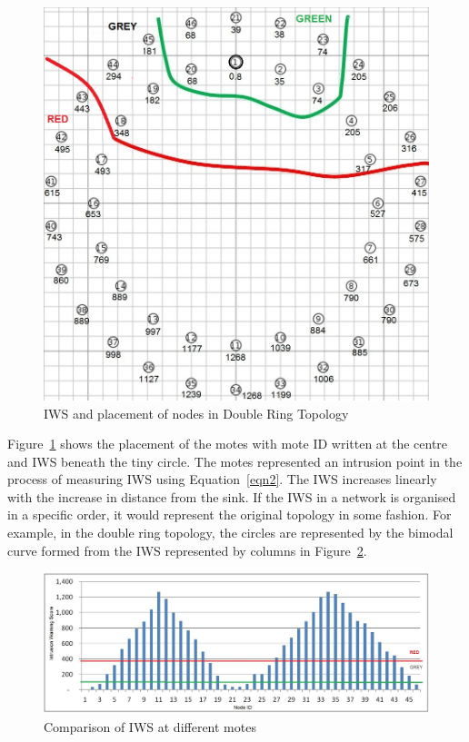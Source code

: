 \documentclass{CRPITStyle}
\begin{document}
\begin{figure}[t]
    \centering
        \includegraphics[width=.8\linewidth]{DoubleRingZ}
        \caption{IWS and placement of nodes in Double Ring Topology}
        \label{fig:elliptopo} 
    \end{figure}

Figure~\ref{fig:elliptopo} shows the placement of the motes with mote ID written at the centre and IWS beneath the tiny circle.
The motes represented an intrusion point in the process of measuring IWS using Equation~\ref{eqn2}.
The IWS increases linearly with the increase in distance from the sink.
If the IWS in a network is organised in a specific order, 
it would represent the original topology in some fashion.
For example, in the double ring topology, the circles are represented by the bimodal curve formed from the IWS represented by columns in Figure~\ref{fig:ellipgraph}.
\begin{figure}[t]
	\centering
        \includegraphics[width=\linewidth]{DR_Column}
        \caption{Comparison of IWS at different motes}
        \label{fig:ellipgraph}
\end{figure}
\end{document}
